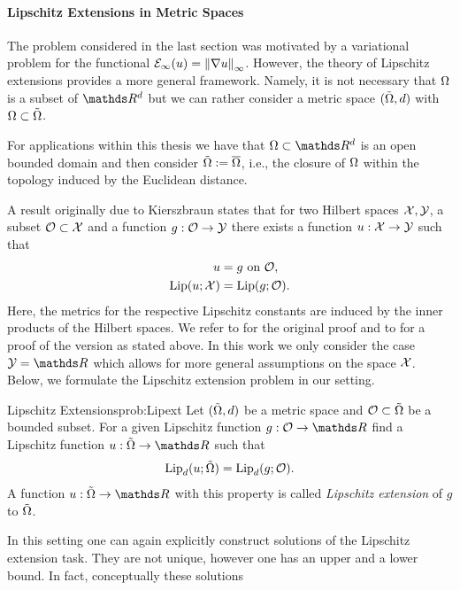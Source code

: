 \paragraph{Lipschitz Extensions in Metric Spaces} The problem considered in the last section was motivated by a variational problem for the functional  $\mathcal{E}_\infty(u)=\left\|\nabla u\right\|_\infty$. However, the theory of Lipschitz extensions provides a more general framework. Namely, it is not necessary that $\Omega$ is a subset of $\R^d$ but we can rather consider a metric space $(\tilde{\Omega},d)$ with $\Omega\subset \tilde{\Omega}$. 
%
\begin{remark}{}{}
For applications within this thesis we have that $\domain\subset\R^d$ is an open bounded domain and then consider 
$\tilde{\Omega}:= \overline{\Omega}$, i.e., the closure of $\Omega$ within the topology induced by the Euclidean distance.
\end{remark}
%
%
%
\noindent%
A result originally due to Kierszbraun \cite{Kirszbraun1934} states that for two Hilbert spaces $\mathcal{X}, \mathcal{\mathcal{Y}}$, a subset $\mathcal{O}\subset \mathcal{X}$ and a function $g:\mathcal{O}\to \mathcal{\mathcal{Y}}$ there exists a function $u:\mathcal{X}\to \mathcal{\mathcal{Y}}$ such that 
%
\begin{align*}
u &= g \text{ on } \mathcal{O},\\
\operatorname{Lip}(u; \mathcal{X}) &= \operatorname{Lip}(g; \mathcal{O}).
\end{align*}
%
Here, the metrics for the respective Lipschitz constants are induced by the inner products of the Hilbert spaces. We refer to \cite{Kirszbraun1934} for the original proof and to \cite[Th. 1.31]{Schwartz1969} for a proof of the version as stated above.
In this work we only consider the case $\Oup=\R$ which allows for more general assumptions on the space $\mathcal{X}$. Below, we formulate the Lipschitz extension problem in our setting.
%
\begin{problem}{Lipschitz Extensions}{prob:Lipext}
Let $(\tilde{\Omega},d)$ be a metric space and $\mathcal{O}\subset \tilde{\Omega}$ be a bounded subset. For a given Lipschitz function $g:\conset\to\R$ find a Lipschitz function $u:\tilde\domain\to \R$ such that
%
\begin{align*}
\operatorname{Lip}_d(u; \tilde{\Omega}) = \operatorname{Lip}_d(g; \mathcal{O}).
\end{align*}
%
A function $u:\tilde{\domain}\to\R$ with this property is called \emph{Lipschitz extension} of 
$g$ to $\tilde{\Omega}$.
\end{problem}
%
\noindent%
In this setting one can again explicitly construct solutions of the Lipschitz extension task. They are not unique, however one has an upper and a lower bound. In fact, conceptually these solutions 

